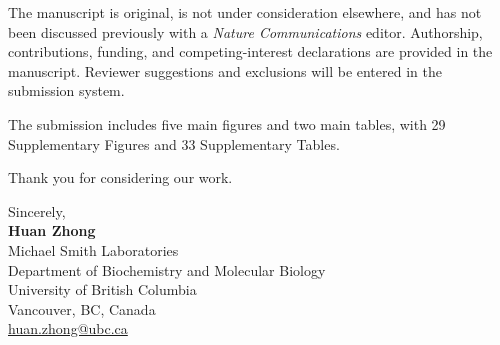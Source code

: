 \documentclass[10pt,letterpaper]{article}
\begin{document}
The manuscript is original, is not under consideration elsewhere, and has not been discussed previously with a \textit{Nature Communications} editor. Authorship, contributions, funding, and competing-interest declarations are provided in the manuscript. Reviewer suggestions and exclusions will be entered in the submission system.

The submission includes five main figures and two main tables, with 29 Supplementary Figures and 33 Supplementary Tables.

Thank you for considering our work.

Sincerely,\\[3pt]
\textbf{Huan Zhong}\\
Michael Smith Laboratories\\
Department of Biochemistry and Molecular Biology\\
University of British Columbia\\
Vancouver, BC, Canada\\
\href{mailto:huan.zhong@ubc.ca}{huan.zhong@ubc.ca}
\end{document}
